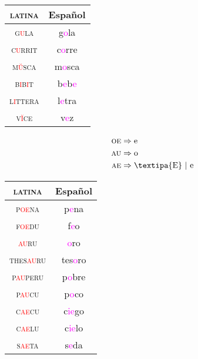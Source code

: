 \documentclass{report}
\begin{document}
\begin{tabular}{c c}
  \textsc{latina} & Español \\
  \hline
  \textsc{g\textcolor{red}{u}la} & g\textcolor{magenta}{o}la \\
  \textsc{c\textcolor{red}{u}rrit} & c\textcolor{magenta}{o}rre \\
  \textsc{m\textcolor{red}{\u{u}}sca} & m\textcolor{magenta}{o}sca \\
  \textsc{b\textcolor{red}{i}b\textcolor{red}{i}t} & b\textcolor{magenta}{e}b\textcolor{magenta}{e} \\
  \textsc{l\textcolor{red}{i}ttera} & l\textcolor{magenta}{e}tra \\
  \textsc{v\textcolor{red}{\u{i}}ce} & v\textcolor{magenta}{e}z \\
\end{tabular}

\begin{tcolorbox}[title=Monophthongization]
  \begin{align*}
    \textsc{oe} & \Rightarrow \text{e} \\
    \textsc{au} & \Rightarrow \text{o} \\
    \textsc{ae} & \Rightarrow \text{\textipa{E}}\ |\ \text{e} \\
  \end{align*}
\end{tcolorbox}

\begin{tabular}{c c}
  \textsc{latina} & Español \\
  \hline
  \textsc{p\textcolor{red}{oe}na} & p\textcolor{magenta}{e}na \\
  \textsc{f\textcolor{red}{oe}du} & f\textcolor{magenta}{e}o \\
  \textsc{\textcolor{red}{au}ru} & \textcolor{magenta}{o}ro \\
  \textsc{thes\textcolor{red}{au}ru} & tes\textcolor{magenta}{o}ro \\
  \textsc{p\textcolor{red}{au}peru} & p\textcolor{magenta}{o}bre \\
  \textsc{p\textcolor{red}{au}cu} & p\textcolor{magenta}{o}co \\
  \textsc{c\textcolor{red}{ae}cu} & c\textcolor{magenta}{ie}go \\
  \textsc{c\textcolor{red}{ae}lu} & c\textcolor{magenta}{ie}lo \\
  \textsc{s\textcolor{red}{ae}ta} & s\textcolor{magenta}{e}da \\
\end{tabular}
\end{document}
